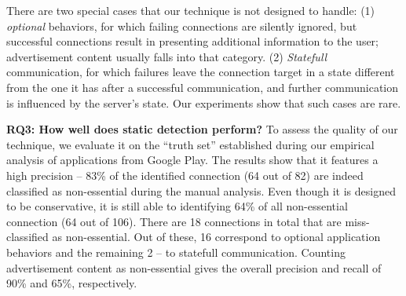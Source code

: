 There are two special cases that our technique is not designed to handle: (1) \emph{optional} behaviors, for which failing connections are silently ignored, but successful connections result in presenting additional information to the user; 
advertisement content usually falls into that category. (2) \emph{Statefull} communication, for which failures leave the 
connection target in a state different from the one it has after a successful communication, and further communication is influenced by the server's state. Our experiments show that such cases are rare. 

%
 



\vspace{0.1in}
\noindent 
{\bf RQ3: How well does static detection perform?}
To assess the quality of our technique, we evaluate it on the ``truth set'' established during our empirical analysis of applications from Google Play.
The results show that it features a high precision -- 83\% of the identified connection (64 out of 82) are indeed classified as non-essential during the manual analysis. Even though it is designed to be conservative, it is still able to identifying  64\% of all non-essential connection (64 out of 106).
There are 18 connections in total that are miss-classified as non-essential. Out of these, 16 correspond to optional application behaviors and the remaining 2 -- to statefull communication. Counting advertisement content as non-essential
gives the overall precision and recall of 90\% and 65\%, respectively.  

